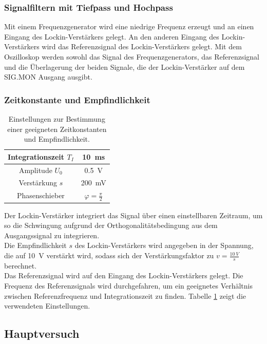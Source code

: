 \documentclass[12pt,a4paper]{article}
\begin{document}
\subsubsection{Signalfiltern mit Tiefpass und Hochpass}
Mit einem Frequenzgenerator wird eine niedrige Frequenz erzeugt und an einen Eingang des Lockin-Verstärkers gelegt. An den anderen Eingang des Lockin-Verstärkers wird das Referenzsignal des Lockin-Verstärkers gelegt. Mit dem Oszilloskop werden sowohl das Signal des Frequenzgenerators, das Referenzsignal und die Überlagerung der beiden Signale, die der Lockin-Verstärker auf dem SIG.MON Ausgang ausgibt.

\subsubsection{Zeitkonstante und Empfindlichkeit}

\begin{table}
\centering
\begin{tabular}{|c|c|}
\hline 
Integrationszeit $T_I$ & \SI{10}{ms} \\ 
\hline 
Amplitude $U_0$ & \SI{0,5}{V} \\
\hline 
Verstärkung $s$ & \SI{200}{mV} \\ 
\hline 
Phasenschieber & $\varphi = \frac{\pi}{2}$ \\ 
\hline 
\end{tabular} 
\caption{Einstellungen zur Bestimmung einer geeigneten Zeitkonstanten und Empfindlichkeit.}
\label{tab:Zeitkonst_Einstellungen}
\end{table}

Der Lockin-Verstärker integriert das Signal über einen einstellbaren Zeitraum, um so die Schwingung aufgrund der Orthogonalitätsbedingung aus dem Ausgangssignal zu integrieren. \\
Die Empfindlichkeit $s$ des Lockin-Verstärkers wird angegeben in der Spannung, die auf \SI{10}{V} verstärkt wird, sodass sich der Verstärkungsfaktor zu $v = \frac{\SI{10}{V}}{s}$ berechnet. \\
Das Referenzsignal wird auf den Eingang des Lockin-Verstärkers gelegt. Die Frequenz des Referenzsignals wird durchgefahren, um ein geeignetes Verhältnis zwischen Referenzfrequenz und Integrationszeit zu finden. Tabelle \ref{tab:Zeitkonst_Einstellungen} zeigt die verwendeten Einstellungen.

\subsection{Hauptversuch}
\end{document}
